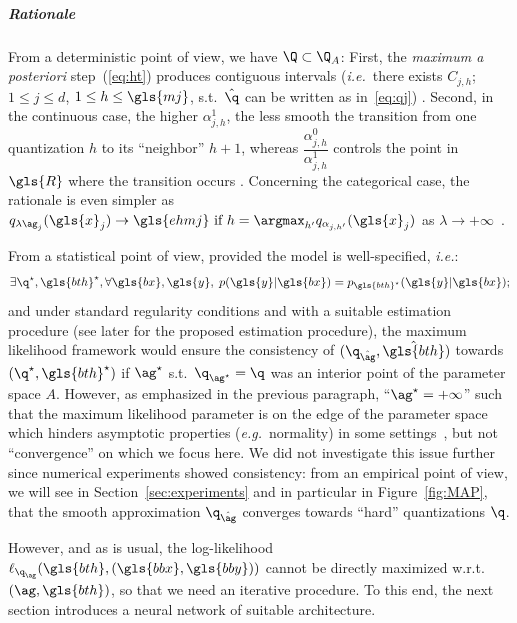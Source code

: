 \subparagraph{Rationale}

From a deterministic point of view, we have $\Q \subset \Q_A$: First, the \textit{maximum a posteriori} step~(\ref{eq:ht}) produces contiguous intervals (\textit{i.e.}\ there exists $C_{j,h}$; $1 \leq j \leq d$, $1 \leq h \leq \gls{mj}$, s.t.\ ${\hat{\q}}$ can be written as in~\ref{eq:qj}) \cite{same2011model}. Second, in the continuous case, the higher $\alpha_{j,h}^1$, the less smooth the transition from one quantization $h$ to its ``neighbor''{\footnotemark[1]{}} $h+1$, whereas $\dfrac{\alpha_{j,h}^0}{\alpha_{j,h}^1}$ controls the point in $\gls{R}$ where the transition occurs \cite{chamroukhi2009regression}. Concerning the categorical case, the rationale is even simpler as $q_{\lambda \ag_j}(\gls{x}_j) \to \gls{ehmj} \text{ if } h = \argmax_{h'} q_{\alpha_{j,h'}}(\gls{x}_j)$ as $\lambda \to +\infty$~\cite{reverdy2016parameter}.

From a statistical point of view, 
provided the model is well-specified, \textit{i.e.}:
\begin{equation} \label{eq:well_quant}
\exists \q^\star, \gls{bth}^\star, \forall \gls{bx},\gls{y}, \; p(\gls{y} | \gls{bx}) = p_{\gls{bth}^\star}(\gls{y} | \gls{bx});
\end{equation}
and under standard regularity conditions and with a suitable estimation procedure (see later for the proposed estimation procedure), the maximum likelihood framework would ensure the consistency of $(\q_{\hat{\ag}}, \hat{\gls{bth}})$ towards $(\q^\star,\gls{bth}^\star)$ if $\ag^\star$ s.t.\ $\q_{\ag^\star} = \q$ was an interior point of the parameter space $A$. However, as emphasized in the previous paragraph, ``$\ag^\star = + \infty$'' such that the maximum likelihood parameter is on the edge of the parameter space which hinders asymptotic properties (\textit{e.g.}\ normality) in some settings~\cite{10.2307/2289471}, but not ``convergence'' on which we focus here. We did not investigate this issue further since numerical experiments showed consistency: from an empirical point of view, we will see in Section~\ref{sec:experiments} and in particular in Figure~\ref{fig:MAP}, that the smooth approximation $\q_{\hat{\ag}}$ converges towards ``hard'' quantizations{\footnotemark[1]{}} $\q$.

However, and as is usual, the log-likelihood $\ell_{\q_{\ag}}(\gls{bth},(\gls{bbx},\gls{bby}))$ cannot be directly maximized w.r.t.\ $(\ag,\gls{bth})$, so that we need an iterative procedure. To this end, the next section introduces a neural network of suitable architecture.

